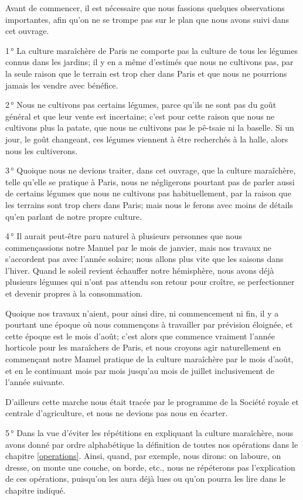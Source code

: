 \documentclass[10pt,a4paper]{book}
\begin{document}
Avant de commencer, il est nécessaire que nous fassions quelques observations importantes, afin qu'on ne se trompe pas sur le plan que nous avons suivi dans cet ouvrage.

1\,° La culture maraîchère de Paris ne comporte pas la culture de tous les légumes connus dans les jardins; il y en a même d'estimés que nous ne cultivons pas, par la seule raison que le terrain est trop cher dans Paris et que nous ne pourrions jamais les vendre avec bénéfice.

2\,° Nous ne cultivons pas certains légumes, parce qu'ils ne sont pas du goût général et que leur vente est incertaine; c'est pour cette raison que nous ne cultivons plus la patate, que nous ne cultivons pas le pê-tsaie ni la baselle. Si un jour, le goût changeant, ces légumes viennent à être recherchés à la halle, alors nous les cultiverons.

3\,° Quoique nous ne devions traiter, dans cet ouvrage, que la culture maraîchère, telle qu'elle se pratique à Paris, nous ne négligerons pourtant pas de parler aussi de certains légumes que nous ne cultivons pas habituellement, par la raison que les terrains sont trop chers dans Paris; mais nous le ferons avec moins de détails qu'en parlant de notre propre culture.

4\,° Il aurait peut-être paru naturel à plusieurs personnes que nous commençassions notre Manuel par le mois de janvier, mais nos travaux ne s'accordent pas avec l'année solaire; nous allons plus vite que les saisons dans l'hiver. Quand le soleil revient échauffer notre hémisphère, nous avons déjà plusieurs légumes qui n'ont pas attendu son retour pour croître, se perfectionner et devenir propres à la consommation.

Quoique nos travaux n'aient, pour ainsi dire, ni commencement ni fin, il y a pourtant une époque où nous commençons à travailler par prévision éloignée, et cette époque est le mois d'août\label{moisdaout}; c'est alors que commence vraiment l'année horticole pour les maraîchers de Paris, et nous croyons agir naturellement en commençant notre Manuel pratique de la culture maraîchère par le mois d'août, et en le continuant mois par mois jusqu'au mois de juillet inclusivement de l'année suivante.

D'ailleurs cette marche nous était tracée par le programme de la Société royale et centrale d'agriculture, et nous ne devions pas nous en écarter.

5\,° Dans la vue d'éviter les répétitions en expliquant la culture maraîchère, nous avons donné par ordre alphabétique la définition de toutes nos opérations dans le chapitre \ref{operations}. Ainsi, quand, par exemple, nous dirons: on laboure, on dresse, on monte une couche, on borde, etc., nous ne répéterons pas l'explication de ces opérations, puisqu'on les aura déjà lues ou qu'on pourra les lire dans le chapitre indiqué.
\end{document}
